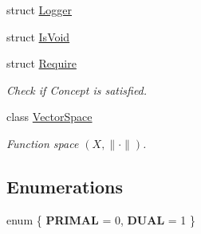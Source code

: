 \begin{DoxyCompactItemize}
struct \hyperlink{structSpacy_1_1Logger}{\-Logger}
\item 
struct \hyperlink{structSpacy_1_1IsVoid}{\-Is\-Void}
\item 
struct \hyperlink{structSpacy_1_1Require}{\-Require}
\begin{DoxyCompactList}\small\item\em \-Check if \-Concept is satisfied. \end{DoxyCompactList}\item 
class \hyperlink{classSpacy_1_1VectorSpace}{\-Vector\-Space}
\begin{DoxyCompactList}\small\item\em \-Function space $(X,\|\cdot\|)$. \end{DoxyCompactList}\end{DoxyCompactItemize}
\subsection*{\-Enumerations}
\begin{DoxyCompactItemize}
\item 
enum \{ {\bfseries \-P\-R\-I\-M\-A\-L} = 0, 
{\bfseries \-D\-U\-A\-L} = 1
 \}
\end{DoxyCompactItemize}
